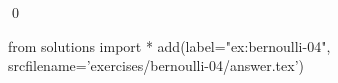 
\begin{ex} 
  \label{ex:bernoulli-04}
  
  \qed
\end{ex} 
\begin{python0}
from solutions import *
add(label="ex:bernoulli-04",
    srcfilename='exercises/bernoulli-04/answer.tex') 
\end{python0}
